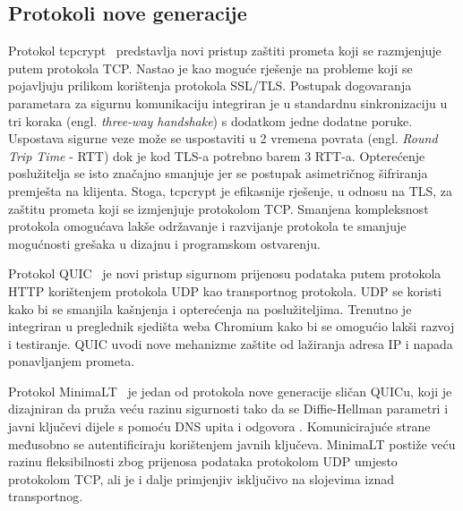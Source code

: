 \subsection{Protokoli nove generacije}
Protokol tcpcrypt~\cite{bittau2010tcpcrypt} predstavlja novi pristup zaštiti
prometa koji se razmjenjuje putem protokola TCP. Nastao je kao moguće rješenje
na probleme koji se pojavljuju prilikom korištenja protokola SSL/TLS\@.
Postupak dogovaranja parametara za sigurnu komunikaciju integriran je u
standardnu sinkronizaciju u tri koraka (engl. \emph{three-way handshake}) s
dodatkom jedne dodatne poruke. Uspostava sigurne veze može se uspostaviti u 2
vremena povrata (engl. \emph{Round Trip Time} - RTT) dok je kod TLS-a potrebno
barem 3 RTT-a. Opterećenje poslužitelja se isto značajno smanjuje jer se
postupak asimetričnog šifriranja premješta na klijenta. Stoga, tcpcrypt
je efikasnije rješenje, u odnosu na TLS, za zaštitu prometa koji se
izmjenjuje protokolom TCP. Smanjena kompleksnost protokola omogućava lakše
održavanje i razvijanje protokola te smanjuje mogućnosti grešaka u dizajnu i
programskom ostvarenju.

Protokol QUIC~\cite{roskind2013quick} je novi pristup sigurnom prijenosu
podataka putem protokola HTTP korištenjem protokola UDP kao transportnog
protokola. UDP se koristi kako bi se smanjila kašnjenja i opterećenja na
poslužiteljima. Trenutno je integriran u preglednik sjedišta weba Chromium kako
bi se
omogućio lakši razvoj i testiranje. QUIC uvodi nove mehanizme zaštite od
lažiranja adresa IP i napada ponavljanjem prometa.


Protokol MinimaLT~\cite{petullo2013minimalt} je jedan od protokola nove
generacije sličan QUICu, koji je dizajniran da pruža veću razinu sigurnosti
tako da se Diffie-Hellman parametri i javni ključevi dijele s pomoću DNS upita
i odgovora \cite{freire2013non}. Komunicirajuće strane međusobno se
autentificiraju korištenjem javnih ključeva. MinimaLT postiže veću razinu
fleksibilnosti zbog prijenosa podataka protokolom UDP umjesto protokolom TCP,
ali je i dalje primjenjiv isključivo na slojevima iznad transportnog.


